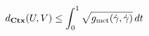 \documentclass[preview]{standalone}
\begin{document}
\begin{align*}
\special{dvisvgm:raw <g id='unique000'>}d_{\mathbf{Ctx}}(U,V) \le \int_0^1 \sqrt{g_{\text{met}}(\dot{\gamma},\dot{\gamma})}\,dt\special{dvisvgm:raw </g>}
\end{align*}
\end{document}
